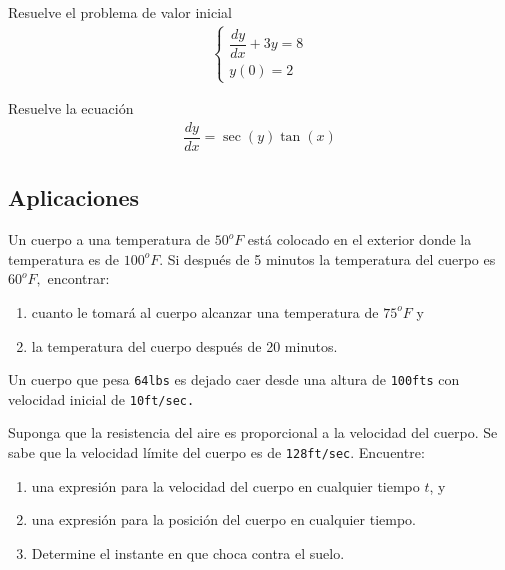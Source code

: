\begin{problema}
	Resuelve el problema de valor inicial
\begin{align*}
	\begin{cases}
		\dfrac{dy}{dx}+3y=8 \\
		y(0)=2
	\end{cases}
\end{align*}
\end{problema}

\begin{problema}
	Resuelve la ecuación
	\begin{align*}
		\dfrac{dy}{dx} = \sec(y)\tan(x)
	\end{align*}
\end{problema}

\subsection{Aplicaciones}


\begin{problema}
	Un cuerpo a una temperatura de $50^{o}F$ está colocado en el exterior donde la temperatura es de $100^{o}F.$ Si después de 5 minutos la temperatura del cuerpo es $60^{o}F,$ encontrar:
	\begin{enumerate}
		\item cuanto le tomará al cuerpo alcanzar una temperatura de $75^{o}F$ y
		\item la temperatura del cuerpo después de 20 minutos.
	\end{enumerate}

\end{problema}

	\begin{problema}
	Un cuerpo que pesa \texttt{64lbs} es dejado caer desde una altura de \texttt{100fts} con velocidad inicial de \texttt{10ft/sec.}

	Suponga que la resistencia del aire es proporcional a la velocidad del cuerpo. Se sabe que la velocidad límite del cuerpo es de \texttt{128ft/sec}. Encuentre:
	\begin{enumerate}
		\item una expresión para la velocidad del cuerpo en cualquier tiempo $t$,  y
		\item una expresión para la posición del cuerpo en cualquier tiempo.
		\item Determine el instante en que choca contra el suelo.
	\end{enumerate}

\end{problema}


